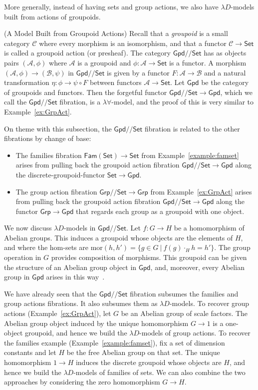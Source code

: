 \documentclass[a4paper,UKenglish]{lipics}
\newcommand{\msf}[1]{\mathsf{#1}} %
\newcommand{\Grp}{\msf{Grp}}
\newcommand{\Set}{\msf{Set}}
\newcommand{\Gpd}{\msf{Gpd}}
\newcommand{\Fam}[1]{\msf{Fam}(#1)}
\newcommand{\A}{\mathcal{A}}
\newcommand{\B}{\mathcal{B}}
\newcommand{\C}{\mathcal{C}}
\newcommand{\Lslice}[1]{#1/\!/\Set}
\newcommand{\GrpSet}{\Lslice{\Grp}}
\newcommand{\GpdSet}{\Lslice{\Gpd}}
\begin{document}
More generally, instead of having sets and group actions, we also have $\lambda D$-models built from actions of groupoids.

\begin{example}(A Model Built from Groupoid Actions)
\label{ex:presheaves}
Recall that a \emph{groupoid} is a small category $\C$ where every morphism is an isomorphism, and that a functor $\C\to\Set$ is called a groupoid action (or presheaf). The category $\GpdSet$ has as objects pairs $(\A,\phi)$ where $\A$ is a groupoid and $\phi:\A\to\Set$ is a functor. A morphism $(\A,\phi) \rightarrow (\B,\psi)$ in $\GpdSet$ is given by a functor $F:\A\rightarrow \B$ and a natural transformation $\eta:\phi \to \psi \circ F$ between functors $\A \to\Set$. Let $\Gpd$ be the category of groupoids and functors. Then the forgetful functor $\GpdSet\to \Gpd$, which we call the $\GpdSet$ fibration, is a $\lambda \forall$-model, and the proof of this is very similar to Example~\ref{ex:GrpAct}.

On theme with this subsection, the $\GpdSet$ fibration is related to the other fibrations by change of base:
\begin{itemize}
\item The families fibration $\Fam\Set\to\Set$ from Example~\ref{example:famset} arises from pulling back the groupoid action fibration $\GpdSet\to\Gpd$ along the discrete-groupoid-functor $\Set\to\Gpd$.

\item The group action fibration $\GrpSet\to\Grp$ from Example~\ref{ex:GrpAct} arises from pulling back the groupoid action fibration $\GpdSet\to\Gpd$ along the functor $\Grp\to\Gpd$ that regards each group as a groupoid with one object.
\end{itemize}

We now discuss $\lambda D$-models in $\GpdSet$. Let $f:G\to H$ be a homomorphism of Abelian groups. This induces a groupoid whose objects are the elements of $H$, and where the hom-sets are $\mathrm{mor}(h,h')=\{g\in G~|~f(g)\cdot_Hh=h'\}$. The group operation in $G$ provides composition of morphisms. This groupoid can be given the structure of an Abelian group object in $\Gpd$, and, moreover, every Abelian group in $\Gpd$ arises in this way~\cite{brown-spencer}.

We have already seen that the $\GpdSet$ fibration subsumes the families and group actions fibrations. It also subsumes them as $\lambda D$-models. To recover group actions (Example~\ref{ex:GrpAct}), let $G$ be an Abelian group of scale factors. The Abelian group object induced by the unique homomorphism $G\to 1$ is a one-object groupoid, and hence we build the $\lambda D$-models of group actions. To recover the families example (Example~\ref{example:famset}), fix a set of dimension constants and let $H$ be the free Abelian group on that set. The unique homomorphism $1\to H$ induces the discrete groupoid whose objects are $H$, and hence we build the $\lambda D$-models of families of sets. We can also combine the two approaches by considering the zero homomorphism $G\to H$.
\end{example}
\end{document}
